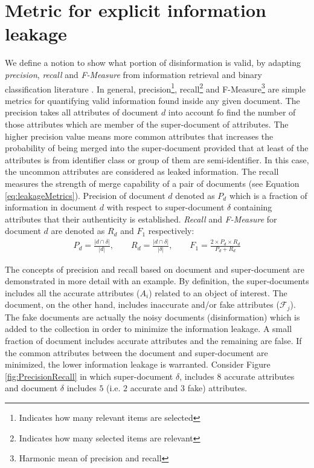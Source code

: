 \section{Metric for explicit information leakage}
\label{app:primaryMetric}

We define a notion to show what portion of disinformation is valid, by adapting {\it precision}, {\it recall} and {\it F-Measure} from information retrieval and binary classification literature \cite{davis2006relationship}. In general, precision\footnote{Indicates how many relevant items are selected }, recall\footnote{Indicates how many selected items are relevant} and F-Measure\footnote{ Harmonic mean of precision and recall} are simple metrics for quantifying valid information found inside any given document. The precision takes all attributes of document $d$ into account fo find the number of those attributes which are member of the super-document of attributes. The higher precision value means more common attributes that increases the probability of being merged into the super-document provided that at least of the attributes is from identifier class or group of them are semi-identifier. In this case, the uncommon attributes are considered as leaked information. The recall measures the strength of merge capability of a pair of documents (see Equation \ref{eq:leakageMetrics}). Precision of document $d$ denoted as $P_d$ which is a fraction of information in document $d$ with respect to super-document  $\delta$ containing attributes that their authenticity is established. \textit{Recall} and \textit{F-Measure} for document $d$ are denoted as $R_d$ and $F_{1}$ respectively:
\begin{equation} 
\label{eq:leakageMetrics}
\begin{aligned}
P_d=\frac{\left\lvert d \cap \delta \right\rvert}{\left\lvert d \right\rvert},\qquad 
R_d=\frac{\left\lvert d \cap \delta \right\rvert}{\left\lvert \delta \right\rvert},\qquad
F_{1}=\frac{2 \times P_d \times R_d}{P_d + R_d}
\end{aligned}
\end{equation}

The concepts of precision and recall based on document and super-document are demonstrated in more detail with an example. By definition, the super-documents includes all the accurate attributes ($A_i$) related to an object of interest. The document, on the other hand, includes inaccurate and/or fake attributes ($\mathcal{F}_j$). The fake documents are actually the noisy documents (disinformation) which is added to the collection in order to minimize the information leakage. A small fraction of document includes accurate attributes and the remaining are false. If the common attributes between the document and super-document are minimized, the lower information leakage is warranted. Consider Figure \ref{fig:PrecisionRecall} in which super-document $\delta$, includes $8$ accurate attributes and document $\delta$ includes $5$ (i.e. $2$ accurate and $3$ fake) attributes.\\

